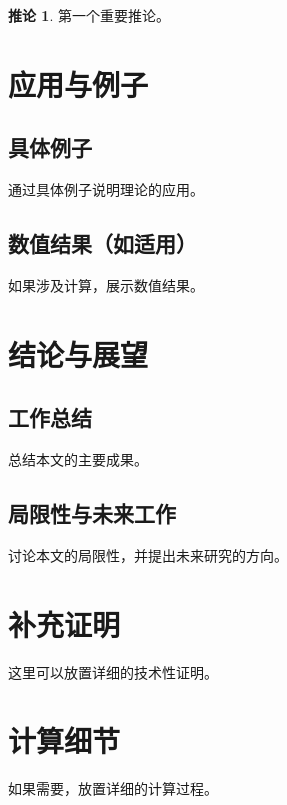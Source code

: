 \documentclass[12pt,a4paper]{report}
\theoremstyle{definition}
\newtheorem{corollary}[theorem]{推论}
\begin{document}
\begin{corollary}\label{cor:first}
第一个重要推论。
\end{corollary}

\chapter{应用与例子}\label{ch:applications}

\section{具体例子}

通过具体例子说明理论的应用。

\section{数值结果（如适用）}

如果涉及计算，展示数值结果。

\chapter{结论与展望}\label{ch:conclusion}

\section{工作总结}

总结本文的主要成果。

\section{局限性与未来工作}

讨论本文的局限性，并提出未来研究的方向。

\newpage


\appendix
\chapter{补充证明}

这里可以放置详细的技术性证明。

\chapter{计算细节}

如果需要，放置详细的计算过程。
\end{document}
